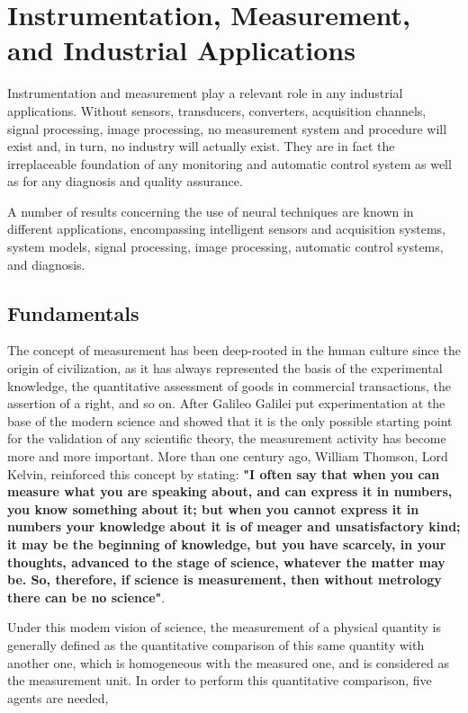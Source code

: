 \chapter{Instrumentation, Measurement,
and Industrial Applications}

Instrumentation and measurement play a relevant role in any industrial applications.
Without sensors, transducers, converters, acquisition channels, signal processing, image
processing, no measurement system and procedure will exist and, in turn, no industry will
actually exist. They are in fact the irreplaceable foundation of any monitoring and
automatic control system as well as for any diagnosis and quality assurance.

A number of results concerning the use of neural techniques are known in
different applications, encompassing intelligent sensors and acquisition systems, system
models, signal processing, image processing, automatic control systems, and diagnosis.

\section{Fundamentals}
The concept of measurement has been deep-rooted in the human culture since the origin of
civilization, as it has always represented the basis of the experimental knowledge, the
quantitative assessment of goods in commercial transactions, the assertion of a right, and so
on.
After Galileo Galilei put experimentation at the base of the modern science and showed
that it is the only possible starting point for the validation of any scientific theory, the
measurement activity has become more and more important. More than one century ago,
William Thomson, Lord Kelvin, reinforced this concept by stating: \textbf{"I often say that when
you can measure what you are speaking about, and can express it in numbers, you know
something about it; but when you cannot express it in numbers your knowledge about it is
of meager and unsatisfactory kind; it may be the beginning of knowledge, but you have
scarcely, in your thoughts, advanced to the stage of science, whatever the matter may be.
So, therefore, if science is measurement, then without metrology there can be no science"}.


Under this modem vision of science, the measurement of a physical quantity is
generally defined as the quantitative comparison of this same quantity with another one,
which is homogeneous with the measured one, and is considered as the measurement unit.
In order to perform this quantitative comparison, five agents are needed,

